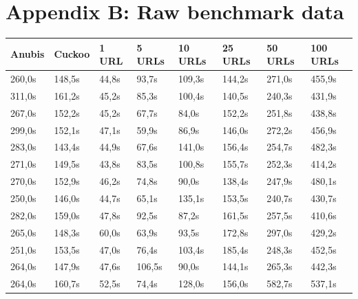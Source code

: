 \documentclass{scrartcl}
\begin{document}
\clearpage

\section*{Appendix B: Raw benchmark data}


\begin{table}[h]
\begin{tabular}{@{}llllllll@{}}
\toprule
Anubis  & Cuckoo  & 1 URL       & 5 URLs      & 10 URLs      & 25 URLs      & 50 URLs      & 100 URLs     \\ \midrule
260,0s  & 148,5s  & 44,8s       & 93,7s       & 109,3s       & 144,2s       & 271,0s       & 455,9s        \\
311,0s  & 161,2s  & 45,2s       & 85,3s       & 100,4s       & 140,5s       & 240,3s       & 431,9s        \\
267,0s  & 152,2s  & 45,2s       & 67,7s       & 84,0s        & 152,2s       & 251,8s       & 438,8s        \\
299,0s  & 152,1s  & 47,1s       & 59,9s       & 86,9s        & 146,0s       & 272,2s       & 456,9s        \\
283,0s  & 143,4s  & 44,9s       & 67,6s       & 141,0s       & 156,4s       & 254,7s       & 482,3s        \\
271,0s  & 149,5s  & 43,8s       & 83,5s       & 100,8s       & 155,7s       & 252,3s       & 414,2s        \\
270,0s  & 152,9s  & 46,2s       & 74,8s       & 90,0s        & 138,4s       & 247,9s       & 480,1s        \\
250,0s  & 146,0s  & 44,7s       & 65,1s       & 135,1s       & 153,5s       & 240,7s       & 430,7s        \\
282,0s  & 159,0s  & 47,8s       & 92,5s       & 87,2s        & 161,5s       & 257,5s       & 410,6s        \\
265,0s  & 148,3s  & 60,0s       & 63,9s       & 93,5s        & 172,8s       & 297,0s       & 429,2s        \\
251,0s  & 153,5s  & 47,0s       & 76,4s       & 103,4s       & 185,4s       & 248,3s       & 452,5s        \\
264,0s  & 147,9s  & 47,6s       & 106,5s      & 90,0s        & 144,1s       & 265,3s       & 442,3s        \\
264,0s  & 160,7s  & 52,5s       & 74,4s       & 128,0s       & 156,0s       & 582,7s       & 537,1s        \\

\end{tabular}
\end{table}
\end{document}

